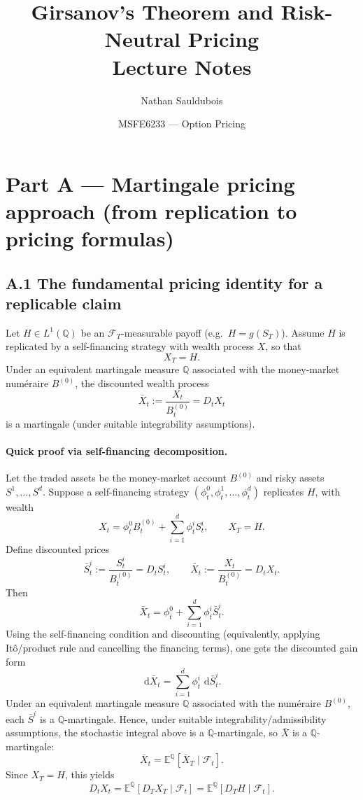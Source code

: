 \documentclass[11pt]{article}
\title{\textbf{Girsanov's Theorem and Risk-Neutral Pricing}\\
\large Lecture Notes}
\author{Nathan Sauldubois}
\date{MSFE6233 --- Option Pricing}
\newcommand{\Qbb}{\mathbb{Q}}
\newcommand{\E}{\mathbb{E}}
\newcommand{\dd}{\,\mathrm{d}}
\newcommand{\1}{\mathbf{1}}
\begin{document}
\maketitle

\section*{Part A --- Martingale pricing approach (from replication to pricing formulas)}



\subsection*{A.1 The fundamental pricing identity for a replicable claim}

Let \(H\in L^1(\Qbb)\) be an \(\mathcal F_T\)-measurable payoff (e.g.\ \(H=g(S_T)\)).
Assume \(H\) is replicated by a self-financing strategy with wealth process \(X\), so that
$$
X_T = H.
$$
Under an equivalent martingale measure \(\Qbb\) associated with the money-market num\'eraire \(B^{(0)}\),
the discounted wealth process
$$
\bar X_t := \frac{X_t}{B_t^{(0)}} = D_tX_t
$$
is a martingale (under suitable integrability assumptions).

\paragraph{Quick proof via self-financing decomposition.}
Let the traded assets be the money-market account \(B^{(0)}\) and risky assets \(S^1,\dots,S^d\).
Suppose a self-financing strategy \((\phi_t^0,\phi_t^1,\dots,\phi_t^d)\) replicates \(H\), with wealth
$$
X_t=\phi_t^0 B_t^{(0)}+\sum_{i=1}^d \phi_t^i S_t^i,
\qquad X_T=H.
$$
Define discounted prices
$$
\bar S_t^i:=\frac{S_t^i}{B_t^{(0)}}=D_tS_t^i,
\qquad
\bar X_t:=\frac{X_t}{B_t^{(0)}}=D_tX_t.
$$
Then
$$
\bar X_t=\phi_t^0+\sum_{i=1}^d \phi_t^i \bar S_t^i.
$$
Using the self-financing condition and discounting (equivalently, applying It\^o/product rule and cancelling the financing terms), one gets the discounted gain form
$$
\dd \bar X_t=\sum_{i=1}^d \phi_t^i\,\dd \bar S_t^i.
$$
Under an equivalent martingale measure \(\Qbb\) associated with the num\'eraire \(B^{(0)}\), each \(\bar S^i\) is a \(\Qbb\)-martingale. Hence, under suitable integrability/admissibility assumptions, the stochastic integral above is a \(\Qbb\)-martingale, so \(\bar X\) is a \(\Qbb\)-martingale:
$$
\bar X_t=\E^{\Qbb}[\bar X_T\mid\mathcal F_t].
$$
Since \(X_T=H\), this yields
$$
D_tX_t=\E^{\Qbb}[D_TX_T\mid\mathcal F_t]
=\E^{\Qbb}[D_TH\mid\mathcal F_t].
$$
\end{document}
